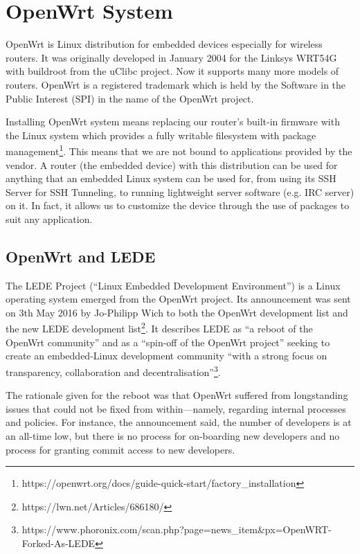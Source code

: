 \section{OpenWrt System}\label{owrt}
OpenWrt is Linux distribution for embedded devices especially for wireless routers.
It was originally developed in January 2004 for the Linksys WRT54G with buildroot from the uClibc project.
Now it supports many more models of routers.
OpenWrt is a registered trademark which is held by the Software in the Public Interest (SPI) in the name of the OpenWrt project.

Installing OpenWrt system means replacing our router’s built-in firmware with the Linux system which provides a fully writable filesystem with package management\footnote{https://openwrt.org/docs/guide-quick-start/factory\_installation}.
This means that we are not bound to applications provided by the vendor.
A router (the embedded device) with this distribution can be used for anything that an embedded Linux system can be used for, from using its SSH Server for SSH Tunneling, to running lightweight server software (e.g. IRC server) on it.
In fact, it allows us to customize the device through the use of packages to suit any application. \cite{openwrt}



\subsection{OpenWrt and LEDE}\label{LEDE}

The LEDE Project (“Linux Embedded Development Environment”) is a Linux operating system emerged from the OpenWrt project.
Its announcement was sent on 3th May 2016 by Jo-Philipp Wich to both the OpenWrt development list and the new LEDE development list\footnote{https://lwn.net/Articles/686180/}.
It describes LEDE as “a reboot of the OpenWrt community” and as a “spin-off of the OpenWrt project” seeking to create an embedded-Linux development community “with a strong focus on transparency, collaboration and decentralisation”\footnote{https://www.phoronix.com/scan.php?page=news\_item\&px=OpenWRT-Forked-As-LEDE}.

The rationale given for the reboot was that OpenWrt suffered from longstanding issues that could not be fixed from within—namely, regarding internal processes and policies.
For instance, the announcement said, the number of developers is at an all-time low, but there is no process for on-boarding new developers and no process for granting commit access to new developers.

